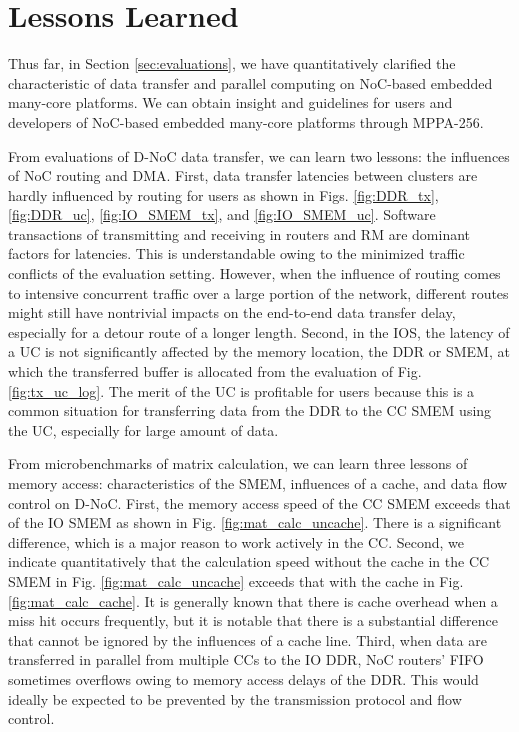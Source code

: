 \section{Lessons Learned}
\label{sec:lessons}
Thus far, in Section \ref{sec:evaluations}, we have quantitatively clarified the characteristic of data transfer and parallel computing on NoC-based embedded many-core platforms.
We can obtain insight and guidelines for users and developers of NoC-based embedded many-core platforms through MPPA-256.

From evaluations of D-NoC data transfer, we can learn two lessons: the influences of NoC routing and DMA.
First, data transfer latencies between clusters are hardly influenced by routing for users as shown in Figs. \ref{fig:DDR_tx}, \ref{fig:DDR_uc}, \ref{fig:IO_SMEM_tx}, and \ref{fig:IO_SMEM_uc}.
Software transactions of transmitting and receiving in routers and RM are dominant factors for latencies.
This is understandable owing to the minimized traffic conflicts of the evaluation setting.
However, when the influence of routing comes to intensive concurrent traffic over a large portion of the network, different routes might still have nontrivial impacts on the end-to-end data transfer delay, especially for a detour route of a longer length.
Second, in the IOS, the latency of a UC is not significantly affected by the memory location, the DDR or SMEM, at which the transferred buffer is allocated from the evaluation of Fig. \ref{fig:tx_uc_log}.
The merit of the UC is profitable for users because this is a common situation for transferring data from the DDR to the CC SMEM using the UC, especially for large amount of data.

From microbenchmarks of matrix calculation, we can learn three lessons of memory access: characteristics of the SMEM, influences of a cache, and data flow control on D-NoC.
First, the memory access speed of the CC SMEM exceeds that of the IO SMEM as shown in Fig. \ref{fig:mat_calc_uncache}.
There is a significant difference, which is a major reason to work actively in the CC.
Second, we indicate quantitatively that the calculation speed without the cache in the CC SMEM in Fig. \ref{fig:mat_calc_uncache} exceeds that with the cache in Fig. \ref{fig:mat_calc_cache}.
It is generally known that there is cache overhead when a miss hit occurs frequently, but it is notable that there is a substantial difference that cannot be ignored by the influences of a cache line.
Third, when data are transferred in parallel from multiple CCs to the IO DDR, NoC routers' FIFO sometimes overflows owing to memory access delays of the DDR.
This would ideally be expected to be prevented by the transmission protocol and flow control.

